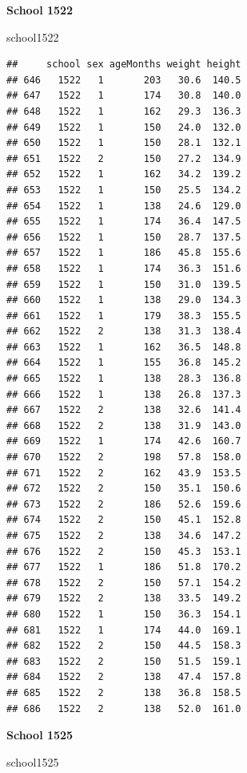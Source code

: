 \documentclass[
  12pt,
]{book}
\newenvironment{Shaded}{\begin{snugshade}}{\end{snugshade}}
\newcommand{\NormalTok}[1]{#1}
\begin{document}
\textbf{School 1522}

\begin{Shaded}
\begin{Highlighting}[]
\NormalTok{school1522}
\end{Highlighting}
\end{Shaded}

\begin{verbatim}
##     school sex ageMonths weight height
## 646   1522   1       203   30.6  140.5
## 647   1522   1       174   30.8  140.0
## 648   1522   1       162   29.3  136.3
## 649   1522   1       150   24.0  132.0
## 650   1522   1       150   28.1  132.1
## 651   1522   2       150   27.2  134.9
## 652   1522   1       162   34.2  139.2
## 653   1522   1       150   25.5  134.2
## 654   1522   1       138   24.6  129.0
## 655   1522   1       174   36.4  147.5
## 656   1522   1       150   28.7  137.5
## 657   1522   1       186   45.8  155.6
## 658   1522   1       174   36.3  151.6
## 659   1522   1       150   31.0  139.5
## 660   1522   1       138   29.0  134.3
## 661   1522   1       179   38.3  155.5
## 662   1522   2       138   31.3  138.4
## 663   1522   1       162   36.5  148.8
## 664   1522   1       155   36.8  145.2
## 665   1522   1       138   28.3  136.8
## 666   1522   1       138   26.8  137.3
## 667   1522   2       138   32.6  141.4
## 668   1522   2       138   31.9  143.0
## 669   1522   1       174   42.6  160.7
## 670   1522   2       198   57.8  158.0
## 671   1522   2       162   43.9  153.5
## 672   1522   2       150   35.1  150.6
## 673   1522   2       186   52.6  159.6
## 674   1522   2       150   45.1  152.8
## 675   1522   2       138   34.6  147.2
## 676   1522   2       150   45.3  153.1
## 677   1522   1       186   51.8  170.2
## 678   1522   2       150   57.1  154.2
## 679   1522   2       138   33.5  149.2
## 680   1522   1       150   36.3  154.1
## 681   1522   1       174   44.0  169.1
## 682   1522   2       150   44.5  158.3
## 683   1522   2       150   51.5  159.1
## 684   1522   2       138   47.4  157.8
## 685   1522   2       138   36.8  158.5
## 686   1522   2       138   52.0  161.0
\end{verbatim}

\textbf{School 1525}

\begin{Shaded}
\begin{Highlighting}[]
\NormalTok{school1525}
\end{Highlighting}
\end{Shaded}
\end{document}
